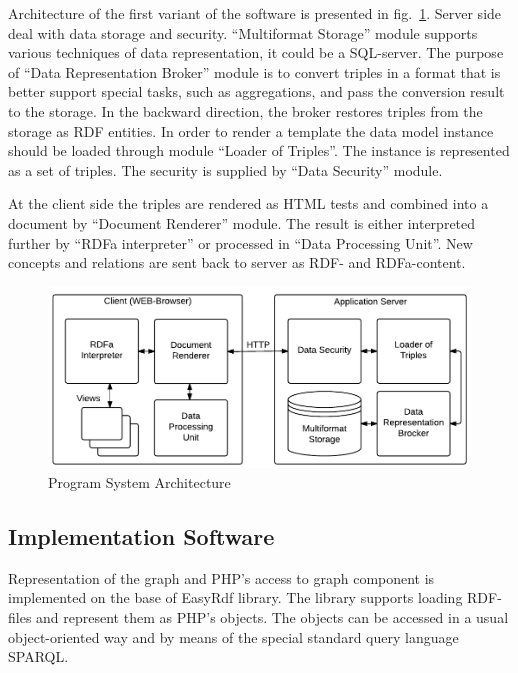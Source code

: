 \documentclass[conference]{IEEEtran}
\begin{document}
Architecture of the first variant of the software is presented in
fig.~\ref{fig:progsys}.  Server side deal with data storage and
security.  ``Multiformat Storage'' module supports various techniques
of data representation, it could be a SQL-server.  The purpose of
``Data Representation Broker'' module is to convert triples in a
format that is better support special tasks, such as aggregations, and
pass the conversion result to the storage.  In the backward direction,
the broker restores triples from the storage as RDF entities.  In
order to render a template the data model instance should be loaded
through module ``Loader of Triples''.  The instance is represented as
a set of triples.  The security is supplied by “Data Security” module.

At the client side the triples are rendered as HTML tests and combined
into a document by ``Document Renderer'' module.  The result is either
interpreted further by ``RDFa interpreter'' or processed in ``Data
Processing Unit''.  New concepts and relations are sent back to server
as RDF- and RDFa-content.

\noindent\begin{figure}[!t]
\centering
\includegraphics[width=\linewidth]{peixe-architecture-en-2.pdf}
\caption{Program System Architecture}
\label{fig:progsys}
\end{figure}

\subsection{Implementation Software}
\label{sec:implsoft}

Representation of the graph and PHP's access to graph component is
implemented on the base of EasyRdf library.  The library supports
loading RDF-files and represent them as PHP's objects.  The objects
can be accessed in a usual object-oriented way and by means of the
special standard query language SPARQL.
\end{document}
